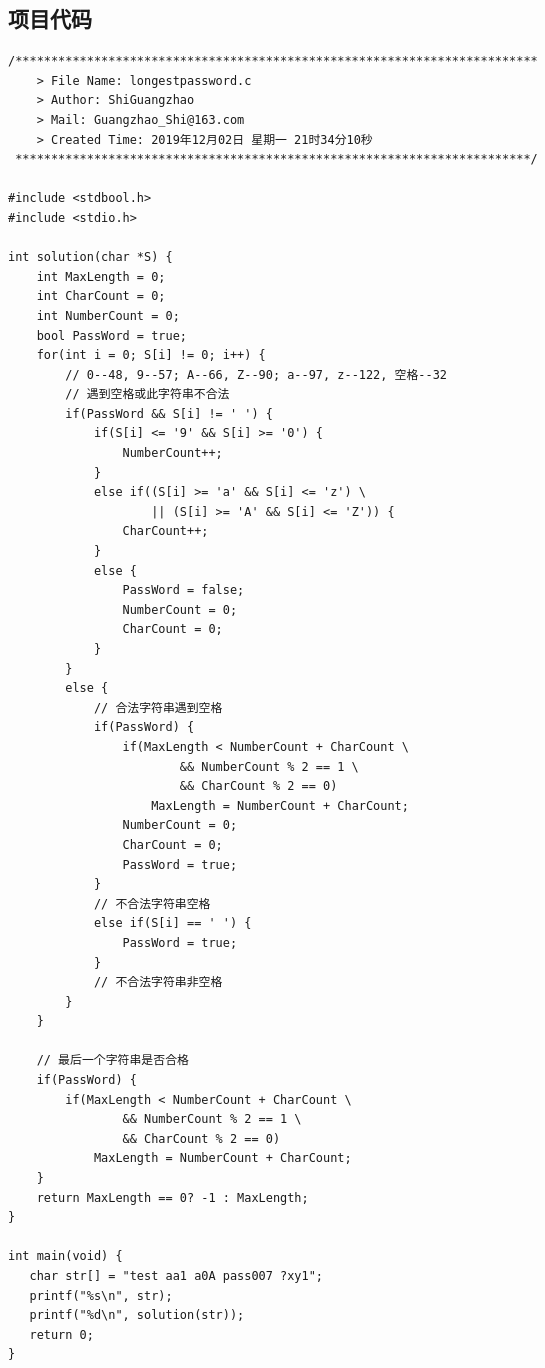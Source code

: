 \begin{spacing}{1.5}
    \subsection{项目代码}
\begin{lstlisting}
/*************************************************************************
    > File Name: longestpassword.c
    > Author: ShiGuangzhao
    > Mail: Guangzhao_Shi@163.com 
    > Created Time: 2019年12月02日 星期一 21时34分10秒
 ************************************************************************/

#include <stdbool.h>
#include <stdio.h>

int solution(char *S) {
    int MaxLength = 0;
    int CharCount = 0;
    int NumberCount = 0;
    bool PassWord = true;
    for(int i = 0; S[i] != 0; i++) {
        // 0--48, 9--57; A--66, Z--90; a--97, z--122, 空格--32
        // 遇到空格或此字符串不合法
        if(PassWord && S[i] != ' ') {
            if(S[i] <= '9' && S[i] >= '0') {
                NumberCount++;
            }
            else if((S[i] >= 'a' && S[i] <= 'z') \
                    || (S[i] >= 'A' && S[i] <= 'Z')) {
                CharCount++;
            }
            else {
                PassWord = false;
                NumberCount = 0;
                CharCount = 0;
            }
        }
        else {
            // 合法字符串遇到空格
            if(PassWord) {
                if(MaxLength < NumberCount + CharCount \
                        && NumberCount % 2 == 1 \
                        && CharCount % 2 == 0)
                    MaxLength = NumberCount + CharCount;
                NumberCount = 0;
                CharCount = 0;
                PassWord = true;
            }
            // 不合法字符串空格
            else if(S[i] == ' ') {
                PassWord = true;
            }
            // 不合法字符串非空格
        }
    }

    // 最后一个字符串是否合格
    if(PassWord) {
        if(MaxLength < NumberCount + CharCount \
                && NumberCount % 2 == 1 \
                && CharCount % 2 == 0)
            MaxLength = NumberCount + CharCount;
    }
    return MaxLength == 0? -1 : MaxLength;
}

int main(void) {
   char str[] = "test aa1 a0A pass007 ?xy1";
   printf("%s\n", str);
   printf("%d\n", solution(str));
   return 0;
}
\end{lstlisting}

\end{spacing}


